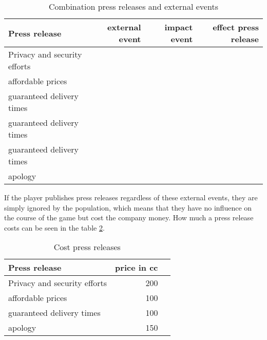 \begin{table}[ht]
\centering
\begin{tabular}{|l|r|r|r|}
\hline
Press release   & external event  & impact event & effect press release
\\ \hline
Privacy and security efforts  &       &      & \\
affordable prices             &       &      & \\
guaranteed delivery times     &       &      & \\
guaranteed delivery times     &       &      & \\
guaranteed delivery times     &       &      & \\
apology                       &       &      & \\
\hline
\end{tabular}
\caption{Combination press releases and external events}
\label{press_release_events}
\end{table}

If the player publishes press releases regardless of these external events, they are simply ignored by the population, which means that they have no influence on the course of the game but cost the company money. How much a press release costs can be seen in the table \ref{cost_press_releases}. 

\begin{table}[ht]
\centering
\begin{tabular}{|l|r|r|}
\hline
Press release                 & price in cc   \\ \hline
Privacy and security efforts  &    200 \\
affordable prices             &    100 \\
guaranteed delivery times     &    100 \\
apology                       &    150 \\
\hline
\end{tabular}
\caption{Cost press releases}
\label{cost_press_releases}
\end{table}

